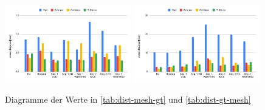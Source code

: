 \begin{figure}[H]
	\centering
	\includegraphics[width=0.49\textwidth]{images/segmentation/meanDistance1.png}
	\includegraphics[width=0.49\textwidth]{images/segmentation/meanDistance2.png}
	\caption{Diagramme der Werte in \autoref{tab:dist-mesh-gt} und \autoref{tab:dist-gt-mesh}}
\end{figure}

